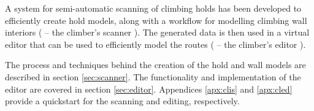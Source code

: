 A system for semi-automatic scanning of climbing holds has been developed to efficiently create hold models, along with a workflow for modelling climbing wall interiors (\raisebox{-0.08em}{} -- the climber's scanner \cite{clis}).
The generated data is then used in a virtual editor that can be used to efficiently model the routes (\raisebox{-0.08em}{} -- the climber's editor \cite{cled}).

The process and techniques behind the creation of the hold and wall models are described in section \ref{sec:scanner}.
The functionality and implementation of the editor are covered in section \ref{sec:editor}.
Appendices \ref{apx:clis} and \ref{apx:cled} provide a quickstart for the scanning and editing, respectively.
